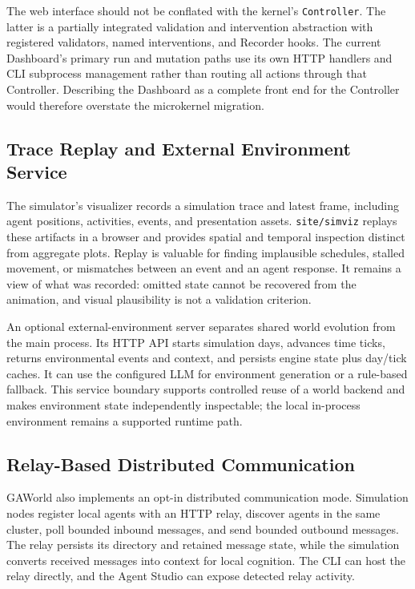The web interface should not be conflated with the kernel's
\texttt{Controller}.  The latter is a partially integrated validation and
intervention abstraction with registered validators, named interventions, and
Recorder hooks.  The current Dashboard's primary run and mutation paths use its
own HTTP handlers and CLI subprocess management rather than routing all actions
through that Controller.  Describing the Dashboard as a complete front end for
the Controller would therefore overstate the microkernel migration.

\subsection{Trace Replay and External Environment Service}

The simulator's visualizer records a simulation trace and latest frame,
including agent positions, activities, events, and presentation assets.
\texttt{site/simviz} replays these artifacts in a browser and provides spatial
and temporal inspection distinct from aggregate plots.  Replay is valuable for
finding implausible schedules, stalled movement, or mismatches between an event
and an agent response.  It remains a view of what was recorded: omitted state
cannot be recovered from the animation, and visual plausibility is not a
validation criterion.

An optional external-environment server separates shared world evolution from
the main process.  Its HTTP API starts simulation days, advances time ticks,
returns environmental events and context, and persists engine state plus
day/tick caches.  It can use the configured LLM for environment generation or a
rule-based fallback.  This service boundary supports controlled reuse of a
world backend and makes environment state independently inspectable; the local
in-process environment remains a supported runtime path.

\subsection{Relay-Based Distributed Communication}

GAWorld also implements an opt-in distributed communication mode.  Simulation
nodes register local agents with an HTTP relay, discover agents in the same
cluster, poll bounded inbound messages, and send bounded outbound messages.
The relay persists its directory and retained message state, while the
simulation converts received messages into context for local cognition.  The
CLI can host the relay directly, and the Agent Studio can expose detected relay
activity.

